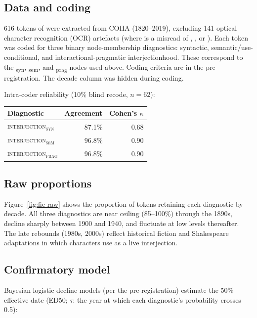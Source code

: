 \documentclass[12pt]{article}
\newcommand{\intj}[1]{\textsc{interjection\textsubscript{#1}}}
\begin{document}
\subsection{Data and coding}

616 tokens of  were extracted from COHA (1820--2019),
excluding 141 optical character recognition (OCR) artefacts (where
 is a
misread of , , or ). Each
token was coded for three binary node-membership diagnostics:
syntactic, semantic/use-conditional, and interactional-pragmatic
interjectionhood. These correspond to the \textsubscript{syn},
\textsubscript{sem}, and \textsubscript{prag} nodes used above. Coding
criteria are in the pre-registration. The decade column was hidden during
coding.

Intra-coder reliability (10\% blind recode, $n = 62$):

\begin{center}
\begin{tabular}{lrr}
  \hline
  Diagnostic & Agreement & Cohen's $\kappa$ \\
  \hline
  \intj{syn} & 87.1\% & 0.68 \\
  \intj{sem} & 96.8\% & 0.90 \\
  \intj{prag} & 96.8\% & 0.90 \\
  \hline
\end{tabular}
\end{center}

\subsection{Raw proportions}

Figure~\ref{fig:fie-raw} shows the proportion of tokens retaining
each diagnostic by decade. All three diagnostics are near ceiling
(85--100\%) through the 1890s, decline sharply between 1900 and 1940,
and fluctuate at low levels thereafter. The late rebounds (1980s,
2000s) reflect historical fiction and Shakespeare adaptations in which
characters use  as a live interjection.

\subsection{Confirmatory model}

Bayesian logistic decline models (per the pre-registration) estimate the
50\% effective date (ED50; $\tau$: the year at which each diagnostic's
probability crosses 0.5):
\end{document}

